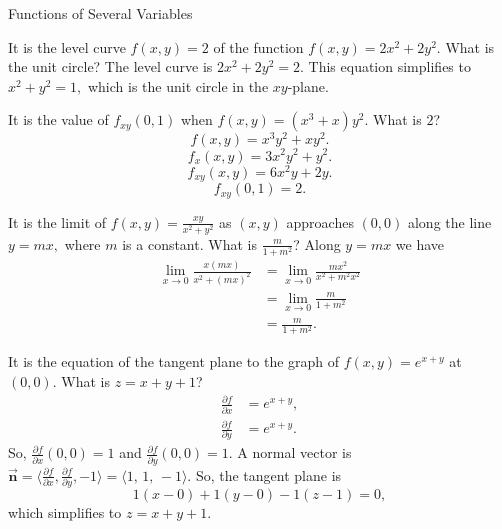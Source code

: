 \documentclass{article}
\newcommand{\bvec}[1]{\vec{\mathbf{#1}}}
\begin{document}
\begin{category}{Functions of Several Variables}

  \begin{clue}[say]
    It is the level curve $f(x,y)=2$ of the function $f(x,y)=2x^2+2y^2.$
  \response
    What is the unit circle?
  \solution
    The level curve is $2x^2+2y^2=2.$ This equation simplifies to $x^2+y^2=1,$ which is the unit circle in the $xy$-plane.
  \end{clue}

  \begin{clue}[say]
    It is the value of $f_{xy}(0,1)$ when $\displaystyle f(x,y) = (x^3 + x)y^2.$
  \response
    What is $2$?
  \solution
    \[
    f(x,y)=x^3y^2+xy^2.
    \]
    \[
    f_x(x,y)=3x^2y^2+y^2.
    \]
    \[
    f_{xy}(x,y)=6x^2y+2y.
    \]
    \[
    f_{xy}(0,1)=2.
    \]
  \end{clue}

  \begin{clue}[write]
    It is the limit of $\displaystyle f(x,y) = \frac{xy}{x^2 + y^2}$ as $(x,y)$ approaches $(0,0)$ along the line $y=mx,$ where $m$ is a constant.
  \response
    What is $\displaystyle \frac{m}{1+m^2}$?
  \solution
    Along $y=mx$ we have
    \begin{align*}
    \lim_{x\to 0}\frac{x(mx)}{x^2+(mx)^2}&=\lim_{x\to 0}\frac{mx^2}{x^2+m^2x^2} \\
    &=\lim_{x\to 0}\frac{m}{1+m^2}\\
    &=\frac{m}{1+m^2}.
    \end{align*}
  \end{clue}

  \begin{clue}[write]
    It is the equation of the tangent plane to the graph of $f(x,y) = e^{x+y}$ at $(0,0).$
  \response
    What is $z=x+y+1$?
  \solution
    \begin{align*}
    \frac{\partial f}{\partial x}&=e^{x+y}, \\
    \frac{\partial f}{\partial y}&=e^{x+y}.
    \end{align*}
    So, $\frac{\partial f}{\partial x}(0,0)=1$ and $\frac{\partial f}{\partial y}(0,0)=1.$
    A normal vector is $\bvec{n}=\langle \tfrac{\partial f}{\partial x}, \tfrac{\partial f}{\partial y}, -1\rangle=\langle 1,\,1,\,-1\rangle.$ So, the tangent plane is
    \[
    1(x-0)+1(y-0)-1(z-1)=0,
    \]
    which simplifies to $z=x+y+1.$
  \end{clue}


\end{category}
\end{document}
